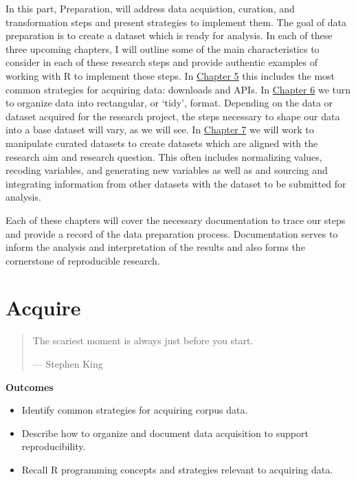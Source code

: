 \documentclass[
  letterpaper,
]{latex/krantz}
\providecommand{\tightlist}{%
  \setlength{\itemsep}{0pt}\setlength{\parskip}{0pt}}\usepackage{longtable,booktabs,array}
\theoremstyle{definition}
\theoremstyle{remark}
\begin{document}
In this part, Preparation, will address data acquistion, curation, and
transformation steps and present strategies to implement them. The goal
of data preparation is to create a dataset which is ready for analysis.
In each of these three upcoming chapters, I will outline some of the
main characteristics to consider in each of these research steps and
provide authentic examples of working with R to implement these steps.
In \hyperref[sec-acquire-chapter]{Chapter 5} this includes the most
common strategies for acquiring data: downloads and APIs. In
\hyperref[sec-curate-data]{Chapter 6} we turn to organize data into
rectangular, or `tidy', format. Depending on the data or dataset
acquired for the research project, the steps necessary to shape our data
into a base dataset will vary, as we will see. In
\hyperref[sec-transform-data]{Chapter 7} we will work to manipulate
curated datasets to create datasets which are aligned with the research
aim and research question. This often includes normalizing values,
recoding variables, and generating new variables as well as and sourcing
and integrating information from other datasets with the dataset to be
submitted for analysis.

Each of these chapters will cover the necessary documentation to trace
our steps and provide a record of the data preparation process.
Documentation serves to inform the analysis and interpretation of the
results and also forms the cornerstone of reproducible research.

\chapter{Acquire}\label{sec-acquire-chapter}

\begin{quote}
The scariest moment is always just before you start.

--- Stephen King
\end{quote}

\begin{tcolorbox}[enhanced jigsaw, colback=white, opacityback=0, bottomrule=.15mm, rightrule=.15mm, breakable, left=2mm, arc=.35mm, colframe=quarto-callout-color-frame, leftrule=.75mm, toprule=.15mm]

\textbf{ Outcomes}

\begin{itemize}
\tightlist
\item
  Identify common strategies for acquiring corpus data.
\item
  Describe how to organize and document data acquisition to support
  reproducibility.
\item
  Recall R programming concepts and strategies relevant to acquiring
  data.
\end{itemize}

\end{tcolorbox}
\end{document}
